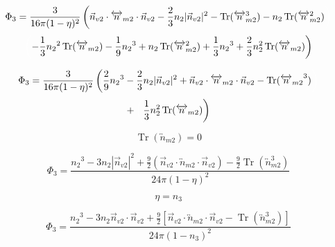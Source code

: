\documentclass[double,12pt]{beavtex}
\begin{document}
\begin{displaymath}{\Phi_3=\frac{3}{16\pi(1-\eta)^2}\left(\vec{n}_{v2}\cdot{\overleftrightarrow{n}_{m2}}\cdot{\vec{n}_{v2}}-\frac{2}{3}n_2|\vec{n}_{v2}|^2-\operatorname{Tr}({\overleftrightarrow{n}_{m2}^3})
-n_2\operatorname{Tr}(\overleftrightarrow{n}_{m2}^2)\color{white}\right)\color{black}}\end{displaymath} 
\begin{equation}{\color{white}\left(\color{black}-\frac{1}{3}{n_2}^2\operatorname{Tr}(\overleftrightarrow{n}_{m2})-\frac{1}{9}{n_2}^3+n_2\operatorname{Tr}(\overleftrightarrow{n}_{m2}^2)+\frac{1}{3}{n_2}^3+\frac{2}{3}n^2_2\operatorname{Tr}(\overleftrightarrow{n}_{m2})\right)}\end{equation} 

\begin{equation}
     \Phi_3=\frac{3}{16\pi(1-\eta)^2}\left(\frac{2}{9}{n_2}^3-\frac{2}{3}n_2|\vec{n}_{v2}|^2+\vec{n}_{v2}\cdot{\overleftrightarrow{n}_{m2}}\cdot{\vec{n}_{v2}}-\operatorname{Tr}({\overleftrightarrow{n}_{m2}}^3)  \color{white}\right)\color{black}\nonumber
\end{equation}
\begin{equation}
      +\color{white}\left(\color{black}\frac{1}{3}n^2_2\operatorname{Tr}(\overleftrightarrow{n}_{m2})\right)\color{black} 
\end{equation}

\begin{equation}{\operatorname{Tr}(\overleftrightarrow{n}_{m2})=0}\end{equation} 

\begin{equation}{\Phi_3=\frac{{n_2}^3-3n_2|\vec{n}_{v2}|^2+\frac{9}{2}(\vec{n}_{v2}\cdot{\overleftrightarrow{n}_{m2}}\cdot{\vec{n}_{v2}})-\frac{9}{2}\operatorname{Tr}({\overleftrightarrow{n}^3_{m2}})}{24\pi(1-\eta)^2}}\end{equation} 

\begin{equation}{\eta=n_3}\end{equation} 

\begin{equation}{\Phi_3=\frac{{n_2}^3-3n_2\vec{n}_{v2}\cdot\vec{n}_{v2}+\frac{9}{2}[\vec{n}_{v2}\cdot{\overleftrightarrow{n}_{m2}}\cdot{\vec{n}_{v2}}-\operatorname{Tr}({\overleftrightarrow{n}^3_{m2}})]}{24\pi(1-n_3)^2}}\end{equation} 
\end{document}
